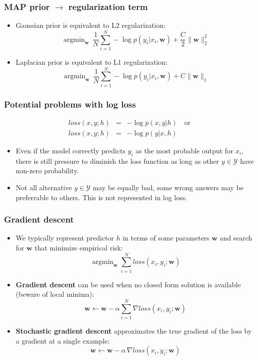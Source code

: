 \documentclass[ignorenonframetext,plain]{beamer}
\DeclareMathOperator*{\argmin}{argmin}
\newcommand{\loss}{\mathit{loss}}
\renewcommand{\vec}{\mathbf}
\begin{document}
\begin{frame}\frametitle{MAP prior $\rightarrow$ regularization term}
\begin{itemize}
\item Gaussian prior is equivalent to L2 regularization: \[
  \argmin_\vec{w}\, \frac{1}{N} \sum_{i=1}^N -\log p(y_i|x_i,\vec{w}) + \frac{C}{2}\|\vec{w}\|_2^2
\]
\item Laplacian prior is equivalent to L1 regularization: \[
  \argmin_\vec{w}\, \frac{1}{N} \sum_{i=1}^N -\log p(y_i|x_i,\vec{w}) + C \|\vec{w}\|_1
\]
\end{itemize}
\end{frame}

\begin{frame}\frametitle{Potential problems with log loss}
\begin{eqnarray*}
\loss(x, y; h) &=& -\log p(x, y | h)\quad\text{or}\\
\loss(x, y; h) &=& -\log p(y | x, h)
\end{eqnarray*}
\begin{itemize}
\item Even if the model correctly predicts $y_i$ as the most probable
  output for $x_i$, there is still pressure to diminish the loss
  function as long as other $y\in\mathcal{Y}$ have non-zero
  probability.
\item Not all alternative $y\in\mathcal{Y}$ may be equally bad, some
  wrong answers may be preferrable to others.  This is not represented
  in log loss.
\end{itemize}
\end{frame}


\begin{frame}\frametitle{Gradient descent}
\begin{itemize}
\item We typically represent predictor $h$ in terms of some parameters
  $\vec{w}$ and search for $\vec{w}$ that minimize empirical
  risk: \[ 
  \argmin_\vec{w} \sum_{i=1}^N \loss(x_i, y_i; \vec{w})
  \]
\item {\bf Gradient descent} can be used when no closed form solution
  is available (beware of local minima): \[ \vec{w} \leftarrow
  \vec{w} - \alpha \sum_{i=1}^N \nabla \loss(x_i, y_i; \vec{w})
\]
\item {\bf Stochastic gradient descent} approximates the true gradient
  of the loss by a gradient at a single example: \[ \vec{w}
  \leftarrow \vec{w} - \alpha\, \nabla \loss(x_i, y_i; \vec{w})
\]
\end{itemize}
\end{frame}
\end{document}
